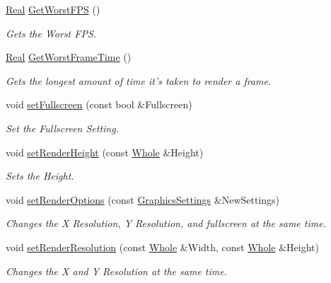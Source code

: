 \begin{DoxyCompactItemize}
\hyperlink{namespacephys_af7eb897198d265b8e868f45240230d5f}{Real} \hyperlink{classphys_1_1GameWindow_a26518aba7a4edbc6628d9f777b62bcaa}{GetWorstFPS} ()
\begin{DoxyCompactList}\small\item\em Gets the Worst FPS. \item\end{DoxyCompactList}\item 
\hyperlink{namespacephys_af7eb897198d265b8e868f45240230d5f}{Real} \hyperlink{classphys_1_1GameWindow_a3e8bcceb201cc2e319fba6b6bf34ee93}{GetWorstFrameTime} ()
\begin{DoxyCompactList}\small\item\em Gets the longest amount of time it's taken to render a frame. \item\end{DoxyCompactList}\item 
void \hyperlink{classphys_1_1GameWindow_a3c710c93a4fca54b5249de09bd4335dc}{setFullscreen} (const bool \&Fullscreen)
\begin{DoxyCompactList}\small\item\em Set the Fullscreen Setting. \item\end{DoxyCompactList}\item 
void \hyperlink{classphys_1_1GameWindow_a92e705ba782ff87dacd9ce487141fcab}{setRenderHeight} (const \hyperlink{namespacephys_a460f6bc24c8dd347b05e0366ae34f34a}{Whole} \&Height)
\begin{DoxyCompactList}\small\item\em Sets the Height. \item\end{DoxyCompactList}\item 
void \hyperlink{classphys_1_1GameWindow_a430e91d4aeb6d1eb62ae84f498310593}{setRenderOptions} (const \hyperlink{structphys_1_1GraphicsSettings}{GraphicsSettings} \&NewSettings)
\begin{DoxyCompactList}\small\item\em Changes the X Resolution, Y Resolution, and fullscreen at the same time. \item\end{DoxyCompactList}\item 
void \hyperlink{classphys_1_1GameWindow_a35ecbf1cb77037d33671e0f879f46a30}{setRenderResolution} (const \hyperlink{namespacephys_a460f6bc24c8dd347b05e0366ae34f34a}{Whole} \&Width, const \hyperlink{namespacephys_a460f6bc24c8dd347b05e0366ae34f34a}{Whole} \&Height)
\begin{DoxyCompactList}\small\item\em Changes the X and Y Resolution at the same time. \item\end{DoxyCompactList}\item 

\end{DoxyCompactItemize}
